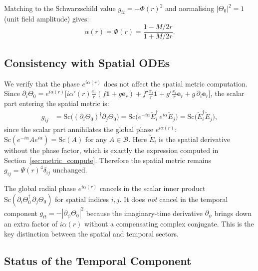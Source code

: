 \documentclass[11pt,a4paper]{article}
\theoremstyle{definition}
\theoremstyle{remark}
\begin{document}
Matching to the Schwarzschild value $g_{tt} = -\Phi(r)^2$ and normalising
$|\Theta_0|^2 = 1$ (unit field amplitude) gives:
\begin{equation}
  \alpha(r) = \Phi(r) = \frac{1 - M/2r}{1 + M/2r}.
  \label{eq:alpha_condition}
\end{equation}

\subsection{Consistency with Spatial ODEs}

We verify that the phase $e^{i\alpha(r)}$ does not affect the spatial
metric computation.  Since $\partial_i\Theta_0 = e^{i\alpha(r)}\bigl[
i\alpha'(r)\tfrac{x_i}{r}(f\mathbf{1}+g\boldsymbol{e}_r)
+ f'\tfrac{x_i}{r}\mathbf{1} + g'\tfrac{x_i}{r}\boldsymbol{e}_r
+ g\,\partial_i\boldsymbol{e}_r\bigr]$, the scalar part entering the spatial
metric is:
\begin{align}
  g_{ij}
  &= \mathrm{Sc}\bigl((\partial_i\Theta_0)^\dagger\partial_j\Theta_0\bigr)
   = \mathrm{Sc}\bigl(e^{-i\alpha}\widetilde{E}_i^\dagger\,e^{i\alpha}\widetilde{E}_j\bigr)
   = \mathrm{Sc}\bigl(\widetilde{E}_i^\dagger\widetilde{E}_j\bigr),
  \label{eq:spatial_phase_cancel}
\end{align}
since the scalar part annihilates the global phase $e^{i\alpha(r)}$:
$\mathrm{Sc}(e^{-i\alpha}Ae^{i\alpha}) = \mathrm{Sc}(A)$ for any
$A \in \mathcal{B}$.  Here $\widetilde{E}_i$ is the spatial derivative
without the phase factor, which is exactly the expression computed in
Section~\ref{sec:metric_compute}.  Therefore the spatial metric remains
$g_{ij} = \Psi(r)^4\delta_{ij}$ unchanged.

\begin{tcolorbox}[colback=blue!5!white,colframe=blue!50!black,
                  title={Consistency Check: Phase Cancellation}]
The global radial phase $e^{i\alpha(r)}$ cancels in the scalar inner product
$\mathrm{Sc}(\partial_i\Theta_0^\dagger\,\partial_j\Theta_0)$ for spatial
indices $i,j$.  It does \emph{not} cancel in the temporal component
$g_{tt} = -|\partial_\psi\Theta_0|^2$ because the imaginary-time derivative
$\partial_\psi$ brings down an extra factor of $i\alpha(r)$ without a
compensating complex conjugate.  This is the key distinction between the
spatial and temporal sectors.
\end{tcolorbox}

\subsection{Status of the Temporal Component}
\end{document}
